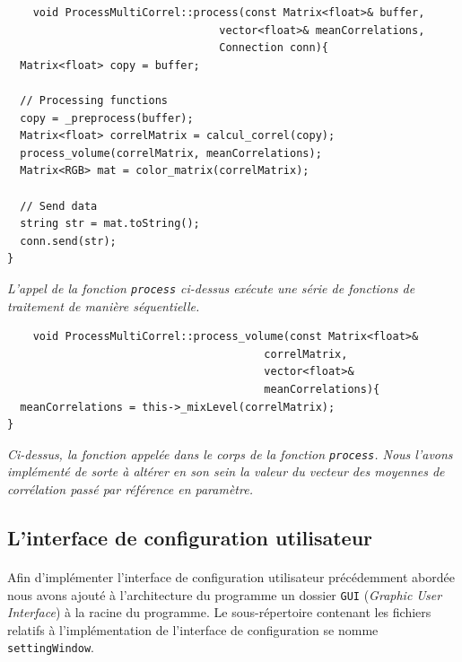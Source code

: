  \begin{lstlisting}
    void ProcessMultiCorrel::process(const Matrix<float>& buffer,
                                 vector<float>& meanCorrelations,
                                 Connection conn){
  Matrix<float> copy = buffer;

  // Processing functions
  copy = _preprocess(buffer);
  Matrix<float> correlMatrix = calcul_correl(copy);
  process_volume(correlMatrix, meanCorrelations);
  Matrix<RGB> mat = color_matrix(correlMatrix);

  // Send data
  string str = mat.toString();
  conn.send(str);
}
 \end{lstlisting}
 \begin{center}
  \textit{L'appel de la fonction \verb!process! ci-dessus exécute une série de fonctions de traitement de manière séquentielle.}
 \end{center}

 \begin{lstlisting}
    void ProcessMultiCorrel::process_volume(const Matrix<float>&
                                        correlMatrix,
                                        vector<float>&
                                        meanCorrelations){
  meanCorrelations = this->_mixLevel(correlMatrix);
}
  \end{lstlisting}
  \begin{center}
    \textit{Ci-dessus, la fonction appelée dans le corps de la fonction \verb!process!. Nous l'avons implémenté de sorte à altérer en son sein la valeur du vecteur des moyennes de corrélation passé par référence en paramètre.}
  \end{center}

\subsection{L'interface de configuration utilisateur}
\paragraph{}
Afin d'implémenter l'interface de configuration utilisateur précédemment abordée
nous avons ajouté à l'architecture du programme un dossier
\verb!GUI! (\textit{Graphic User Interface}) à la racine du programme.
Le sous-répertoire contenant les fichiers relatifs à l'implémentation de
l'interface de configuration se nomme \verb!settingWindow!.

